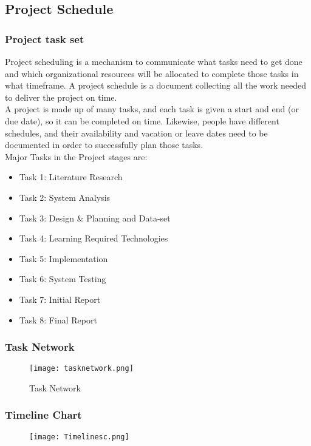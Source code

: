 \documentclass[10pt,a4paper]
{article}
\numberwithin{table}{section}
\begin{document}
{{\begin{normalsize}
\subsection{Project Schedule}  
\subsubsection{Project task set}
\hspace*{0.3cm} Project scheduling is a mechanism to communicate what tasks need to get done and which organizational resources will be allocated to complete those tasks in what timeframe. A project schedule is a document collecting all the work needed to deliver the project on time.  \\
 \hspace*{0.3cm}A project is made up of many tasks, and each task is given a start and end (or due date), so it can be completed on time. Likewise, people have different schedules, and their availability and vacation or leave dates need to be documented in order to successfully plan those tasks.\\



Major Tasks in the Project stages are:
\begin{itemize}
\item Task 1: Literature Research
\item Task 2: System Analysis
\item Task 3: Design \& Planning and Data-set
\item Task 4: Learning Required Technologies
\item Task 5: Implementation
\item Task 6: System Testing
\item Task 7: Initial Report
\item Task 8: Final Report
\end{itemize}
\newpage
\subsubsection{Task Network}
\begin{center}
	  \begin{figure}[h]
			\centering
			\texttt{[image: tasknetwork.png]}
			\caption{Task Network}
		\end{figure}
	\end{center}		
\subsubsection{Timeline Chart}
\vspace{0.3 in}
\begin{center}
\begin{figure}[h]
\centering
			\texttt{[image: Timelinesc.png]}
			

\end{figure}
\end{center}
\end{normalsize}}}
\end{document}
